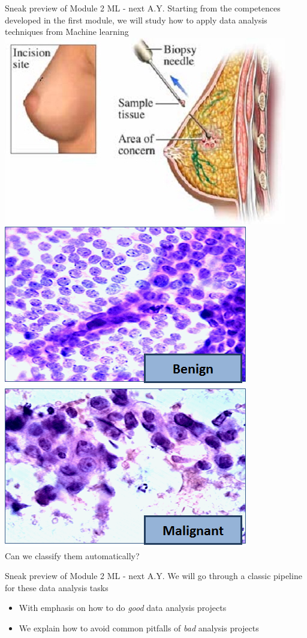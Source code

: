 \documentclass{beamer}%
\begin{document}
\begin{frame}{Sneak preview of Module 2  ML - next A.Y.}
	\centering 
	Starting from the competences developed in the first module, we will study
	how to apply data analysis techniques from Machine learning
	\includegraphics[width=0.4\linewidth]{figures/Breast-Biopsy-2.jpg}\\
	\includegraphics[width=0.4\linewidth]{figures/fna-benign1.png}
	\includegraphics[width=0.4\linewidth]{figures/fna-malignant1.png}\\
	Can we classify them automatically?
\end{frame}

\begin{frame}{Sneak preview of Module 2   ML - next A.Y.}
	We will go through a classic pipeline for these data analysis tasks
\begin{itemize}
	\item With emphasis on how to do \emph{good} data analysis projects
	\item We explain how to avoid common pitfalls of \emph{bad} analysis projects
	\end{itemize}		
\end{frame}
\end{document}
